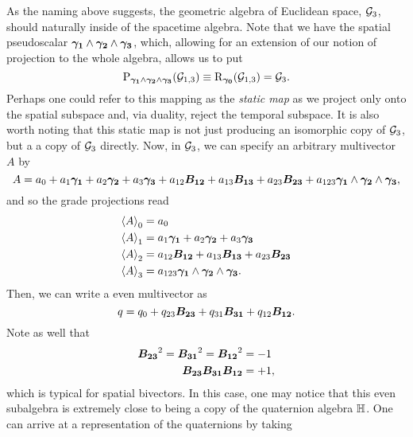 As the naming above suggests, the geometric algebra of Euclidean space, $\G_3$, should naturally inside of the spacetime algebra. Note that we have the spatial pseudoscalar $\blade{\gamma_1} \wedge \blade{\gamma_2} \wedge \blade{\gamma_3}$, which, allowing for an extension of our notion of projection to the whole algebra, allows us to put
\begin{equation}
\projection_{\blade{\gamma_1} \wedge \blade{\gamma_2} \wedge \blade{\gamma_3}}(\G_{1,3}) \equiv \rejection_{\blade{\gamma_0}} (\G_{1,3}) = \G_3.
\end{equation}
Perhaps one could refer to this mapping as the \emph{static map} as we project only onto the spatial subspace and, via duality, reject the temporal subspace. It is also worth noting that this static map is not just producing an isomorphic copy of $\G_3$, but a a copy of $\G_3$ directly. Now, in $\G_3$, we can specify an arbitrary multivector $A$ by
\begin{equation}
A= a_0 + a_1 \blade{\gamma_1} + a_2 \blade{\gamma_2} + a_3 \blade{\gamma_3} + a_{12} \blade{B_{12}} + a_{13} \blade{B_{13}} + a_{23} \blade{B_{23}} + a_{123} \blade{\gamma_1} \wedge \blade{\gamma_2} \wedge \blade{\gamma_3},
\end{equation}
and so the grade projections read
\begin{subequations}
\begin{align}
\proj{0}{A}&=a_0\\
\proj{1}{A}&=a_1 \blade{\gamma_1} + a_2 \blade{\gamma_2} + a_3 \blade{\gamma_3}\\
\proj{2}{A}&=a_{12} \blade{B_{12}} + a_{13} \blade{B_{13}} + a_{23} \blade{B_{23}}\\
\proj{3}{A}&= a_{123} \blade{\gamma_1} \wedge \blade{\gamma_2} \wedge \blade{\gamma_3}.
\end{align}
\end{subequations}
Then, we can write a even multivector as
\begin{equation}
q = q_0 + q_{23}\blade{B_{23}} + q_{31} \blade{B_{31}} + q_{12} \blade{B_{12}}.
\end{equation}
Note as well that
\begin{subequations}
\begin{align}
\blade{B_{23}}^2 = \blade{B_{31}}^2 = \blade{B_{12}}^2 &= -1\\
\blade{B_{23}}\blade{B_{31}}\blade{B_{12}} &= +1,
\end{align}
\end{subequations}
which is typical for spatial bivectors. In this case, one may notice that this even subalgebra is extremely close to being a copy of the quaternion algebra $\quat$. One can arrive at a representation of the quaternions by taking
